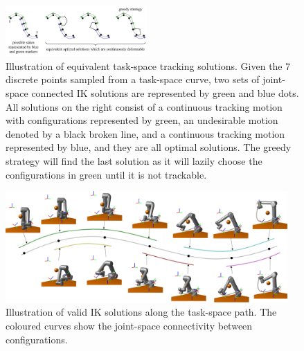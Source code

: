 \documentclass[letterpaper, 10 pt, journal, twoside]{ieeetran}  %
\begin{document}
\begin{figure}[t]
\centering
\includegraphics[width=0.48\textwidth]{figures/greedy}
\caption{Illustration of equivalent task-space tracking solutions. Given the $7$ discrete points sampled from a task-space curve, two sets of joint-space connected IK solutions are represented by green and blue dots. All solutions on the right consist of a continuous tracking motion with configurations represented by green, an undesirable motion denoted by a black broken line, and a continuous tracking motion represented by blue, and they are all optimal solutions. The greedy strategy will find the last solution as it will lazily choose the configurations in green until it is not trackable.}\label{fig:equiv}
\vspace{-0.5cm}
\end{figure}


\begin{figure}[t]
\centering
\includegraphics[width=0.96\textwidth]{figures/case_study/comb_3}
\caption{Illustration of valid IK solutions along the task-space path. 
The coloured curves show the joint-space connectivity between configurations. }\label{fig:allpose}
\vspace{-0.5cm}
\end{figure}
\end{document}
